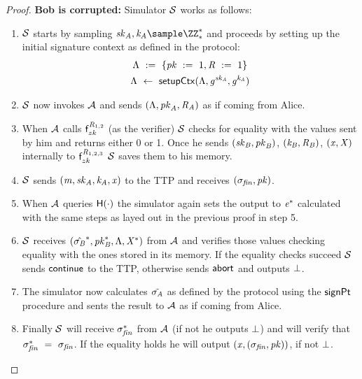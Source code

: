 \begin{proof}
    \textbf{Bob is corrupted: } Simulator $\mathcal{S}$ works as follows:
    \begin{enumerate}
        \item $\mathcal{S}$ starts by sampling $\varSecKeyAlice, \varNonceAlice \sample \cnstIntegersPrimeWithoutZero{*}$ and proceeds by setting up the initial signature context as defined in the protocol:
        \begin{gather*}
            \Lambda ~:=~ \{ \mathit{pk} ~:=~ 1, \mathit{R} ~:=~ 1 \} \\
            \Lambda ~\leftarrow~ \mathsf{setupCtx}( \Lambda, \mathit{g}^{\mathit{sk}_{\mathit{A}}}, \mathit{g}^{\mathit{\mathit{k}_{\mathit{A}}}} ) \\
        \end{gather*}
        \item $\mathcal{S}$ now invokes $\mathcal{A}$ and sends $(\Lambda, \mathit{pk}_{\mathit{A}}, \mathit{R}_{\mathit{A}})$ as if coming from Alice.
        \item When $\mathcal{A}$ calls $\mathsf{f}^{\mathit{R}_{1,2}}_{zk}$ (as the verifier) $\mathcal{S}$ checks for equality with the values sent by him and returns either 0 or 1.
        Once he sends $(\mathit{sk}_{\mathit{B}}, \mathit{pk}_{\mathit{B}})$, $(\mathit{\mathit{k}_{\mathit{B}}}, \mathit{R}_{\mathit{B}})$, $(\mathit{x}, \mathit{X})$ internally to $\mathsf{f}^{\mathit{R}_{1,2,3}}_{zk}$ $\mathcal{S}$ saves them to his memory.
        \item $\mathcal{S}$ sends $(\mathit{m}, \mathit{sk}_{\mathit{A}}, \mathit{\mathit{k}_{\mathit{A}}}, \mathit{x})$ to the TTP and receives $(\sigma_{\mathit{fin}}, \mathit{pk})$.
        \item When $\mathcal{A}$ queries $\mathsf{H} (\cdot)$ the simulator again sets the output to $\mathit{e}^*$ calculated with the same steps as layed out in the previous proof in step 5.
        \item $\mathcal{S}$ receives $(\hat{\sigma_{\mathit{B}}}^*, \mathit{pk}_{\mathit{B}}^*, \Lambda, \mathit{X}^*)$ from $\mathcal{A}$ and verifies those values checking equality with the ones stored in its memory.
        If the equality checks succeed $\mathcal{S}$ sends $\mathsf{continue}$ to the TTP, otherwise sends $\mathsf{abort}$ and outputs $\bot$.
        \item The simulator now calculates $\tilde{\sigma_{\mathit{A}}}$ as defined by the protocol using the $\mathsf{signPt}$ procedure and sents the result to $\mathcal{A}$ as if coming from Alice.
        \item Finally $\mathcal{S}$ will receive $\sigma_{\mathit{fin}}^*$ from $\mathcal{A}$ (if not he outputs $\bot$) and will verify that $\sigma_{\mathit{fin}}^* ~=~ \sigma_{\mathit{fin}}$.
        If the equality holds he will output $(\mathit{x}, (\sigma_{\mathit{fin}}, \mathit{pk}))$, if not $\bot$.
    \end{enumerate}
    

\end{proof}
